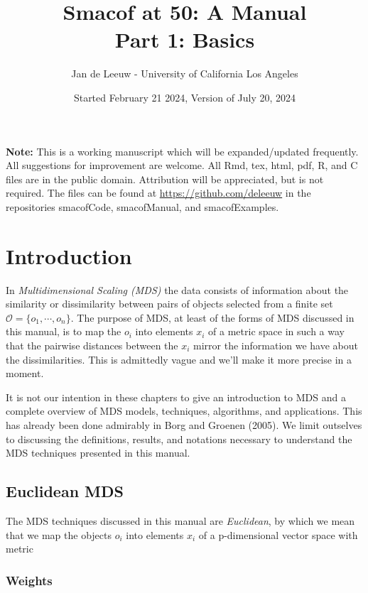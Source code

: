 \documentclass[
  12pt,
]{article}
\title{Smacof at 50: A Manual\\
Part 1: Basics}
\author{Jan de Leeuw - University of California Los Angeles}
\date{Started February 21 2024, Version of July 20, 2024}
\newcommand{\sectionbreak}{\pagebreak}
\begin{document}
\maketitle

{
\setcounter{tocdepth}{4}
\tableofcontents
}
\textbf{Note:} This is a working manuscript which will be expanded/updated
frequently. All suggestions for improvement are welcome. All Rmd, tex,
html, pdf, R, and C files are in the public domain. Attribution will be
appreciated, but is not required. The files can be found at
\url{https://github.com/deleeuw} in the repositories smacofCode, smacofManual,
and smacofExamples.

\sectionbreak

\section{Introduction}\label{introduction}

In \emph{Multidimensional Scaling (MDS)} the data consists of information
about the similarity or dissimilarity between pairs of objects selected
from a finite set \(\mathcal{O}=\{o_1,\cdots,o_n\}\). The purpose of MDS,
at least of the forms of MDS discussed in this manual, is to map
the \(o_i\) into elements \(x_i\) of a metric space in such a way that
the pairwise distances between the \(x_i\) mirror the information we have about the dissimilarities. This is admittedly vague and we'll make it more
precise in a moment.

It is not our intention in these chapters to give an introduction to MDS
and a complete overview of MDS models, techniques, algorithms, and
applications. This has already been done admirably in
Borg and Groenen (2005). We limit outselves to discussing the definitions, results, and notations necessary to understand the MDS techniques presented in this manual.

\subsection{Euclidean MDS}\label{euclidean-mds}

The MDS techniques discussed in this manual are \emph{Euclidean}, by which we mean that we map the objects \(o_i\) into elements \(x_i\) of a p-dimensional vector space with metric

\subsubsection{Weights}\label{weights}
\end{document}
